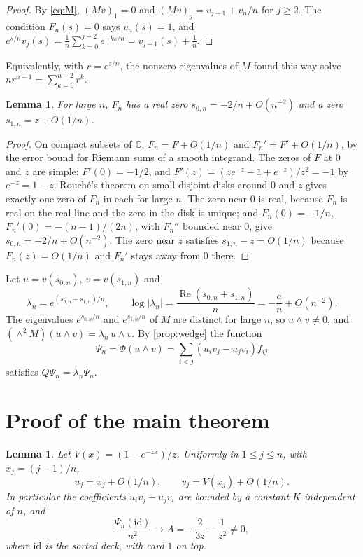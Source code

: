 \documentclass[11pt,a4paper]{article}
\numberwithin{equation}{section}
\newtheorem{lemma}[theorem]{Lemma}
\theoremstyle{remark}
\newcommand{\C}{\mathbb C}
\newcommand{\abs}[1]{\lvert#1\rvert}
\DeclareMathOperator{\re}{Re}
\begin{document}
\begin{proof}
By \eqref{eq:M}, $(Mv)_1=0$ and $(Mv)_j=v_{j-1}+v_n/n$ for $j\ge2$. The condition $F_n(s)=0$ says $v_n(s)=1$, and $e^{s/n}v_j(s)=\frac1n\sum_{k=0}^{j-2}e^{-ks/n}=v_{j-1}(s)+\frac1n$.
\end{proof}

Equivalently, with $r=e^{s/n}$, the nonzero eigenvalues of $M$ found this way solve $nr^{n-1}=\sum_{k=0}^{n-2}r^k$.

\begin{lemma}\label{lem:roots}
For large $n$, $F_n$ has a real zero $s_{0,n}=-2/n+O(n^{-2})$ and a zero $s_{1,n}=z+O(1/n)$.
\end{lemma}

\begin{proof}
On compact subsets of $\C$, $F_n=F+O(1/n)$ and $F_n'=F'+O(1/n)$, by the error bound for Riemann sums of a smooth integrand. The zeros of $F$ at $0$ and $z$ are simple: $F'(0)=-1/2$, and $F'(z)=(ze^{-z}-1+e^{-z})/z^2=-1$ by $e^{-z}=1-z$. Rouch\'e's theorem on small disjoint disks around $0$ and $z$ gives exactly one zero of $F_n$ in each for large $n$. The zero near $0$ is real, because $F_n$ is real on the real line and the zero in the disk is unique; and $F_n(0)=-1/n$, $F_n'(0)=-(n-1)/(2n)$, with $F_n''$ bounded near $0$, give $s_{0,n}=-2/n+O(n^{-2})$. The zero near $z$ satisfies $s_{1,n}-z=O(1/n)$ because $F_n(z)=O(1/n)$ and $F_n'$ stays away from $0$ there.
\end{proof}

Let $u=v(s_{0,n})$, $v=v(s_{1,n})$ and
\begin{equation}\label{eq:lambda}
\lambda_n=e^{(s_{0,n}+s_{1,n})/n},\qquad \log\abs{\lambda_n}=\frac{\re(s_{0,n}+s_{1,n})}n=-\frac an+O(n^{-2}).
\end{equation}
The eigenvalues $e^{s_{0,n}/n}$ and $e^{s_{1,n}/n}$ of $M$ are distinct for large $n$, so $u\wedge v\ne0$, and $(\wedge^2M)(u\wedge v)=\lambda_n\,u\wedge v$. By \cref{prop:wedge} the function
\begin{equation}\label{eq:Psi}
\Psi_n=\Phi(u\wedge v)=\sum_{i<j}(u_iv_j-u_jv_i)f_{ij}
\end{equation}
satisfies $Q\Psi_n=\lambda_n\Psi_n$.

\section{Proof of the main theorem}\label{sec:proof}

\begin{lemma}\label{lem:size}
Let $V(x)=(1-e^{-zx})/z$. Uniformly in $1\le j\le n$, with $x_j=(j-1)/n$,
\[
u_j=x_j+O(1/n),\qquad v_j=V(x_j)+O(1/n).
\]
In particular the coefficients $u_iv_j-u_jv_i$ are bounded by a constant $K$ independent of $n$, and
\begin{equation}\label{eq:A}
\frac{\Psi_n(\mathrm{id})}{n^2}\to A=-\frac2{3z}-\frac1{z^2}\ne0,
\end{equation}
where $\mathrm{id}$ is the sorted deck, with card $1$ on top.
\end{lemma}
\end{document}
